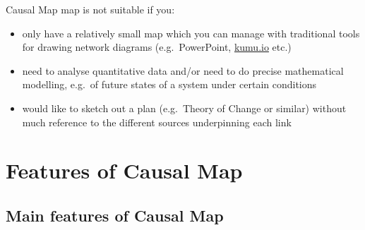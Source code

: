 \documentclass[
]{book}
\providecommand{\tightlist}{%
  \setlength{\itemsep}{0pt}\setlength{\parskip}{0pt}}
\begin{document}
Causal Map map is not suitable if you:

\begin{itemize}
\tightlist
\item
  only have a relatively small map which you can manage with traditional tools for drawing network diagrams (e.g.~PowerPoint, \href{http://kumu.io}{kumu.io} etc.)
\item
  need to analyse quantitative data and/or need to do precise mathematical modelling, e.g.~of future states of a system under certain conditions
\item
  would like to sketch out a plan (e.g.~Theory of Change or similar) without much reference to the different sources underpinning each link
\end{itemize}

\hypertarget{features-of-causal-map}{%
\chapter{Features of Causal Map}\label{features-of-causal-map}}

\hypertarget{main-features-of-causal-map}{%
\section{Main features of Causal Map}\label{main-features-of-causal-map}}
\end{document}
